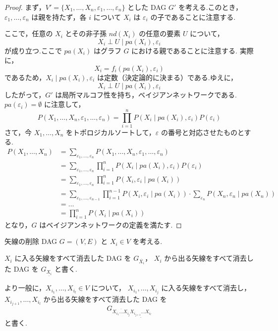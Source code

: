 \documentclass[uplatex, dvipdfmx]{jsarticle}
\begin{document}
\begin{proof}
  まず，$V' = \{X_1, \dots, X_n, \varepsilon_1, \dots, \varepsilon_n\}$ とした DAG $G'$ を考える.このとき，$\varepsilon_1, \dots, \varepsilon_n$ は親を持たず，各 $i$ について $X_i$ は $\varepsilon_i$ の子であることに注意する.

  ここで，任意の $X_i$ とその非子孫 $nd(X_i)$ の任意の要素 $U$ について，
  \begin{equation}
    X_i \perp U \mid pa(X_i), \varepsilon_i
  \end{equation}
  が成り立つ.ここで $pa(X_i)$ はグラフ $G$ における親であることに注意する.
  実際に，
  \begin{equation}
    X_i = f_i(pa(X_i), \varepsilon_i) 
  \end{equation}
  であるため，$X_i \mid pa(X_i), \varepsilon_i$ は定数（決定論的に決まる）である.ゆえに，
  \begin{equation}
    X_i \perp U \mid pa(X_i), \varepsilon_i 
  \end{equation}
  したがって，$G'$ は局所マルコフ性を持ち，ベイジアンネットワークである.$pa(\varepsilon_i) = \emptyset$ に注意して，
  \begin{equation}
    P(X_1, \dots, X_n, \varepsilon_1, \dots, \varepsilon_n) = \prod_{i=1}^n P(X_i \mid pa(X_i), \varepsilon_i) P(\varepsilon_i)
  \end{equation}
  さて，今 $X_1, \dots, X_n$ をトポロジカルソートして，$\varepsilon$ の番号と対応させたものとする.
  \begin{align}
    P(X_1, \dots, X_n) &= \sum_{\varepsilon_1, \dots, \varepsilon_n} P(X_1, \dots, X_n, \varepsilon_1, \dots, \varepsilon_n) \\
    &= \sum_{\varepsilon_1, \dots, \varepsilon_n} \prod_{i=1}^n P(X_i \mid pa(X_i), \varepsilon_i) P(\varepsilon_i) \\
    &= \sum_{\varepsilon_1, \dots, \varepsilon_n} \prod_{i=1}^n P(X_i, \varepsilon_i \mid pa(X_i)) \\
    &= \sum_{\varepsilon_1, \dots, \varepsilon_{n-1}} \prod_{i=1}^{n-1} P(X_i, \varepsilon_i \mid pa(X_i)) \cdot \sum_{\varepsilon_n} P(X_n, \varepsilon_n \mid pa(X_n)) \\
    &= \dots \\
    &= \prod_{i=1}^n P(X_i \mid pa(X_i))
  \end{align}
  となり，$G$ はベイジアンネットワークの定義を満たす.
\end{proof}

\begin{defn}{矢線の削除}
  DAG $G=(V,E)$ と $X_i \in V$ を考える.
  
  $X_i$ に入る矢線をすべて消去した DAG を $G_{\overline{X_i}}$，
  $X_i$ から出る矢線をすべて消去した DAG を $G_{\underline{X_i}}$ と書く.
  
  より一般に，$X_{i_1}, \dots, X_{i_l} \in V$ について，
  $X_{i_1}, \dots, X_{i_j}$ に入る矢線をすべて消去し，
  $X_{i_{j+1}}, \dots, X_{i_l}$ から出る矢線をすべて消去した DAG を
  \[
    G_{\overline{X_{i_1} \dots X_{i_j}} \underline{X_{i_{j+1}} \dots X_{i_l}}}
  \]
  と書く.
\end{defn}
\end{document}
